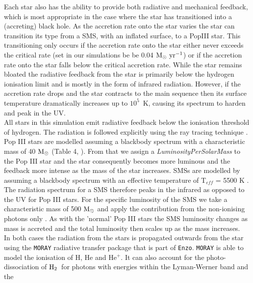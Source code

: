 \documentclass[graphics, twocolumn, usenatbib]{mn2e}
\newcommand{\enzoc}{\texttt{Enzo}}
\newcommand{\msolar} {$\rm{M_{\odot}}~$}
\newcommand{\msolarc} {$\rm{M_{\odot}}$}
\newcommand{\msolaryrc} {$\rm{M_{\odot}~yr^{-1}}$}
\newcommand{\molH} {$\rm{H_2}$~}
\begin{document}
\begin{figure}
\end{figure}
\indent Each star also has the ability to provide both radiative and mechanical feedback, which is
most appropriate in the case where the star has transitioned into a (accreting) black hole. As the
accretion rate onto the star varies the star can transition its type from a SMS, with an inflated
surface, to a PopIII star.  This transitioning only occurs if the accretion rate onto the star either
never exceeds the critical rate (set in our simulations be be 0.04 \msolaryrc) or if the accretion
rate onto the star falls below the critical accretion rate. While the star remains bloated the
radiative
feedback from the star is primarily below the hydrogen ionisation limit and is mostly in the
form of infrared radiation. However, if the accretion rate drops and the star contracts to the
main sequence then its surface temperature dramatically increases up to $10^5$~K,
causing its spectrum to harden and peak in the UV. \\
\indent All stars in this simulation emit radiative feedback below the ionisation threshold of
hydrogen. The radiation is followed explicitly using the ray tracing technique \citep{WiseAbel_2011}.
Pop III stars are modelled assuming a blackbody spectrum with a characteristic mass of 40 \msolarc
 (Table 4, \cite{Schaerer_2002}). From that we assign a \textit{LuminosityPerSolarMass} to the
Pop III star and the star consequently becomes more luminous and the feedback more intense as the mass
of the star increases.  SMSs are modelled by assuming
a blackbody spectrum with an effective temperature of T$_{eff}$ = 5500 K \citep{Hosokawa_2013}.
The radiation spectrum for a SMS therefore peaks in the infrared as opposed to the UV for Pop
III stars. For the specific luminosity of the SMS we take a characteristic mass of 500 \msolar and
apply the contribution from the non-ionising photons only \citep{Schaerer_2002}. As with the 'normal'
Pop III stars the SMS luminosity changes as mass is accreted and the total luminosity then
scales up as the mass increases. \\
\indent In both cases the radiation from the stars is propagated outwards from the star using the
\texttt{MORAY} radiative transfer package \citep{WiseAbel_2011} that is part of \enzoc.
\texttt{MORAY} is able to model the ionisation of H, He and He$^{+}$. It can also account for the
photo-dissociation of \molH for photons with energies within the Lyman-Werner band and the
\end{document}

